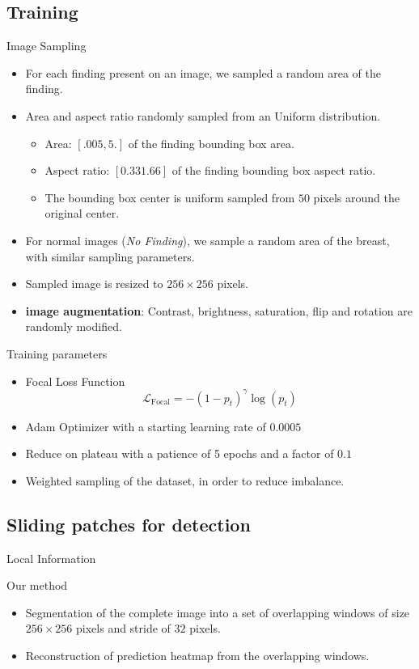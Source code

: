 \subsection{Training}
\begin{frame}{Image Sampling}
    \begin{itemize}
        \item For each finding present on an image, we sampled a random area of the finding.
        \item Area and aspect ratio randomly sampled from an Uniform distribution.
        \begin{itemize}
            \item Area: $[.005, 5.]$ of the finding bounding box area.
            \item Aspect ratio: $[0.33 1.66]$ of the finding bounding box aspect ratio.
            \item The bounding box center is uniform sampled from $50$ pixels around the original center.
        \end{itemize}
        \item For normal images (\emph{No Finding}), we sample a random area of the breast, with similar sampling parameters.
        \item Sampled image is resized to $256 \times 256$ pixels.
        \item \textbf{image augmentation}: Contrast, brightness, saturation, flip and rotation are randomly modified.
    \end{itemize}
\end{frame}

\begin{frame}{Training parameters}
    \begin{itemize}
        \item Focal Loss Function \begin{equation*}
            \mathcal{L}_{\text{Focal}} = -(1 - p_t)^\gamma \log{(p_t)}
        \end{equation*}
        \item Adam Optimizer with a starting learning rate of $0.0005$
        \item Reduce on plateau with a patience of 5 epochs and a factor of $0.1$
        \item Weighted sampling of the dataset, in order to reduce imbalance.
    \end{itemize}
\end{frame}

\subsection{Sliding patches for detection}
\begin{frame}{Local Information}
    
\end{frame}

\begin{frame}{Our method}
    \begin{itemize}
        \item Segmentation of the complete image into a set of overlapping windows of size $256 \times 256$ pixels and stride of $32$ pixels.
        \item Reconstruction of prediction heatmap from the overlapping windows.
    \end{itemize}
\end{frame}
